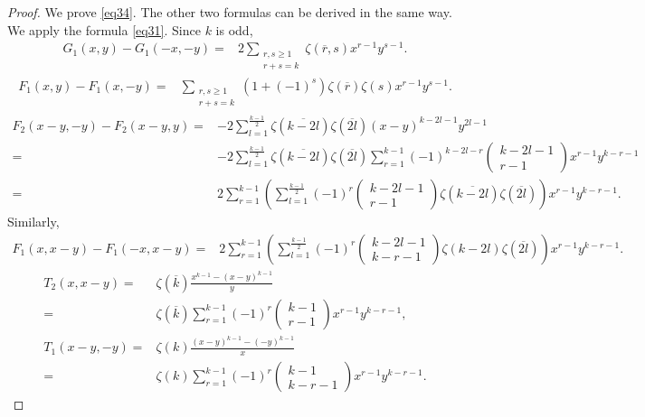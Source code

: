 \documentclass[reqno]{amsart}
\theoremstyle{definition}
\theoremstyle{remark}
\numberwithin{equation}{section}
\begin{document}
\begin{proof}
We prove \eqref{eq34}. The other two formulas can be derived in the same way. We apply the formula \eqref{eq31}. Since $k$ is odd,
\begin{align*}
G_1(x,y)-G_1(-x,-y)=&2\sum_{\substack{r, s\geq 1\\r+s=k}}\zeta(\overline{r}, s)x^{r-1}y^{s-1}.
\end{align*}
\begin{align*}
F_1(x,y)-F_1(x, -y)=& \sum_{\substack{r, s\geq 1\\r+s=k}}\left(1+(-1)^s\right)\zeta(\overline{r})\zeta(s)x^{r-1}y^{s-1}.
\end{align*}
\begin{align*}
F_2(x-y,-y)-F_2(x-y,y)=&-2\sum_{l=1}^{\frac{k-1}{2}}\zeta(\overline{k-2l})\zeta(\overline{2l})(x-y)^{k-2l-1}  y^{2l-1}\\
=&-2\sum_{l=1}^{\frac{k-1}{2}}\zeta(\overline{k-2l})\zeta(\overline{2l})\sum_{r=1}^{k-1}(-1)^{k-2l-r}\begin{pmatrix}k-2l-1\\r-1\end{pmatrix} x^{r-1}  y^{k-r-1}\\
=&2\sum_{r=1}^{k-1}\left(\sum_{l=1}^{\frac{k-1}{2}}(-1)^{r}\begin{pmatrix}k-2l-1\\r-1\end{pmatrix}\zeta(\overline{k-2l})\zeta(\overline{2l})\right) x^{r-1}  y^{k-r-1}.
\end{align*}
Similarly,
\begin{align*}
F_1(x,x-y)-F_1(-x,x-y) =&2\sum_{r=1}^{k-1}\left(\sum_{l=1}^{\frac{k-1}{2}}(-1)^r\begin{pmatrix}k-2l-1\\k-r-1\end{pmatrix}\zeta(k-2l)\zeta(\overline{2l})\right) x^{r-1}  y^{k-r-1}.
\end{align*}
\begin{align*}
T_2(x,x-y)=&\zeta(\overline{k})\frac{x^{k-1}-(x-y)^{k-1}}{y} \\
=&\zeta(\overline{k})\sum_{r=1}^{k-1} (-1)^r\begin{pmatrix} k-1\\r-1\end{pmatrix} x^{r-1}y^{k-r-1},\\
T_1(x-y,-y)=&\zeta(k)\frac{(x-y)^{k-1}-(-y)^{k-1}}{x}\\
=&\zeta(k)\sum_{r=1}^{k-1}(-1)^r\begin{pmatrix} k-1\\k-r-1\end{pmatrix}x^{r-1}y^{k-r-1}.

\end{align*}
\end{proof}
\end{document}

